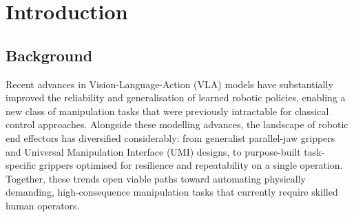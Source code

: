 \documentclass[conference]{IEEEtran}
\begin{document}
\begin{abstract} %
This paper presents the development of a Vision-Language-Action (VLA) policy for autonomous grasping and insertion of Manual Service Disconnect (MSD) plugs, undertaken in collaboration with Extend Robotics. MSD plugs are found in high-voltage systems where human operation is hazardous and tactile feedback is severely attenuated by mandatory insulating PPE, making robotic automation both safety-critical and technically demanding.

Working within a compressed 14-day hardware access window, we built a complete teleoperation, data collection, and training pipeline on a 7-DOF Franka Emika Panda arm, collecting 236 demonstration episodes and fine-tuning SmolVLA and ACT policies for the task. In parallel, a haptic-feedback grasping policy was developed on the Robotera xHand1, demonstrating that tactile sensing meaningfully improves hold stability and reduces motor over-exertion. A proof-of-concept MSD plugging policy was successfully demonstrated on hardware.

Key findings include the critical role of controlled output jitter in enabling millimetre-precision plug insertion, the unexpectedly strong sensitivity of single-task fine-tuned VLAs to prompt phrasing, and the advantage of behavioural diversity over data quality in small demonstration datasets. The $\pi_0$ training pipeline was fully validated and the dataset prepared, with near-perfect success rates anticipated upon fine-tuning. The data collection pipeline developed here is task-agnostic and provides a reusable foundation for future precision insertion tasks.
\end{abstract}

\section{Introduction}

\subsection{Background}

Recent advances in Vision-Language-Action (VLA) models have substantially improved the reliability and generalisation of learned robotic policies, enabling a new class of manipulation tasks that were previously intractable for classical control approaches. Alongside these modelling advances, the landscape of robotic end effectors has diversified considerably: from generalist parallel-jaw grippers and Universal Manipulation Interface (UMI) designs, to purpose-built task-specific grippers optimised for resilience and repeatability on a single operation. Together, these trends open viable paths toward automating physically demanding, high-consequence manipulation tasks that currently require skilled human operators.
\end{document}
